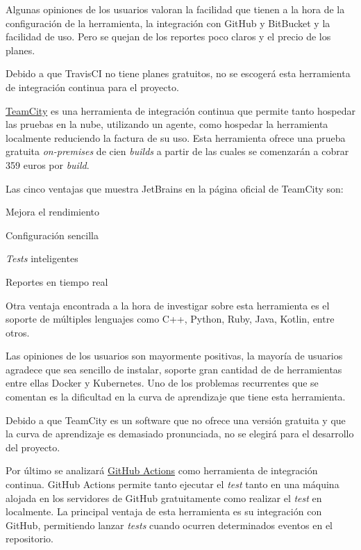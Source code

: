 Algunas opiniones de los usuarios valoran la facilidad que tienen a la hora de la configuración de la herramienta, la integración con GitHub y BitBucket y la facilidad de uso. Pero se quejan de los reportes poco claros y el precio de los planes. \cite{TravisCI2023}

Debido a que TravisCI no tiene planes gratuitos, no se escogerá esta herramienta de integración continua para el proyecto. 

\href{https://www.jetbrains.com/es-es/teamcity/}{TeamCity} es una herramienta de integración continua que permite tanto hospedar las pruebas en la nube, utilizando un agente, como hospedar la herramienta localmente reduciendo la factura de su uso. Esta herramienta ofrece una prueba gratuita \emph{on-premises} de cien \emph{builds} a partir de las cuales se comenzarán a cobrar 359 euros por \emph{build}.

Las cinco ventajas que muestra JetBrains en la página oficial de TeamCity son:
\begin{numerate}
    \item Mejora el rendimiento
    \item Configuración sencilla
    \item \emph{Tests} inteligentes
    \item Reportes en tiempo real
\end{numerate}

Otra ventaja encontrada a la hora de investigar sobre esta herramienta es el soporte de múltiples lenguajes como C++, Python, Ruby, Java, Kotlin, entre otros.

Las opiniones de los usuarios son mayormente positivas, la mayoría de usuarios agradece que sea sencillo de instalar, soporte gran cantidad de de herramientas entre ellas Docker y Kubernetes. Uno de los problemas recurrentes que se comentan es la dificultad en la curva de aprendizaje que tiene esta herramienta. 

Debido a que TeamCity es un software que no ofrece una versión gratuita y que la curva de aprendizaje es demasiado pronunciada, no se elegirá para el desarrollo del proyecto. 

Por último se analizará \href{https://github.com/features/actions}{GitHub Actions} como herramienta de integración continua. GitHub Actions permite tanto ejecutar el \emph{test} tanto en una máquina alojada en los servidores de GitHub gratuitamente como realizar el \emph{test} en localmente. La principal ventaja de esta herramienta es su integración con GitHub, permitiendo lanzar \emph{tests} cuando ocurren determinados eventos en el repositorio.

